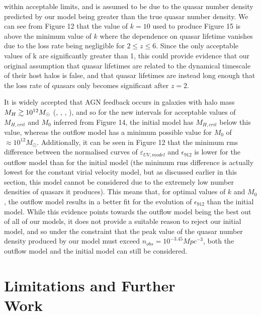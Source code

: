 \documentclass[12pt]{article}%
\begin{document}
\twocolumngrid


\noindent within acceptable limits, and is assumed to be due to the quasar number density predicted by our model being greater than the true quasar number density. We can see from Figure 12 that the value of $k=10$ used to produce Figure 15 is above the minimum value of $k$ where the dependence on quasar lifetime vanishes due to the loss rate being negligible for $2\leq z\leq6$. Since the only acceptable values of k are significantly greater than 1, this could provide evidence that our original assumption that quasar lifetimes are related to the dynamical timescale of their host halos is false, and that quasar lifetimes are instead long enough that the loss rate of quasars only becomes significant after $z=2$.

It is widely accepted that AGN feedback occurs in galaxies with halo mass \hspace{1mm} $M_H\gtrsim10^{12}\\M_\odot$ (\cite{Ikea}, \cite{Byrne}, \cite{Bassini}, \cite{Somerville}), and so for the new intervals for acceptable values of $M_{H,crit}$ and $M_0$ inferred from Figure 14, the initial model has $M_{H,crit}$ below this value, whereas the outflow model has a minimum possible value for $M_0$ of $\approx10^{12}M_\odot$. Additionally, it can be seen in Figure 12 that the minimum rms difference between the normalised curves of $\varepsilon_{UV,model}$ and $\epsilon_{912}$ is lower for the outflow model than for the initial model (the minimum rms difference is actually lowest for the constant virial velocity model, but as discussed earlier in this section, this model cannot be considered due to the extremely low number densities of quasars it produces). This means that, for optimal values of $k$ and $M_0$, the outflow model results in a better fit for the evolution of $\epsilon_{912}$ than the initial model. While this evidence points towards the outflow model being the best out of all of our models, it does not provide a suitable reason to reject our initial model, and so under the constraint that the peak value of the quasar number density produced by our model must exceed $n_{obs}=10^{-3.45}Mpc^{-3}$, both the outflow model and the initial model can still be considered.

\section{Limitations and Further\\Work}
\end{document}
